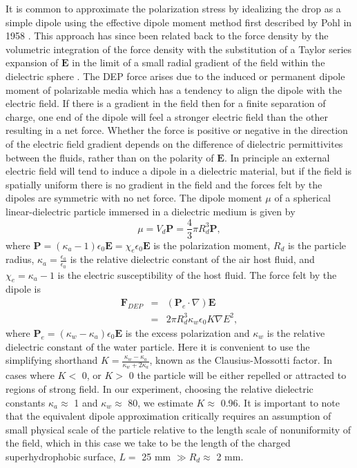 \documentclass[12pt,a4paper,oneside]{book}
\begin{document}
It is common to approximate the polarization stress by idealizing the drop as a simple dipole using the effective dipole moment method first described by Pohl in 1958 \cite{pohl_effects_1958}. This approach has since been related back to the force density by the volumetric integration of the force density with the substitution of a Taylor series expansion of $\mathbf{E}$ in the limit of a small radial gradient of the field within the dielectric sphere \cite{wang_general_1997}. The DEP force arises due to the induced or permanent dipole moment of polarizable media which has a tendency to align the dipole with the electric field. If there is a gradient in the field then for a finite separation of charge, one end of the dipole will feel a stronger electric field than the other resulting in a net force. Whether the force is positive or negative in the direction of the electric field gradient depends on the difference of dielectric permittivites between the fluids, rather than on the polarity of $\mathbf{E}$. In principle an external electric field will tend to induce a dipole in a dielectric material, but if the field is spatially uniform there is no gradient in the field and the forces felt by the dipoles are symmetric with no net force. The dipole moment $\mu$ of a spherical linear-dielectric particle immersed in a dielectric medium is given by
\begin{equation} \label{dipole_m_1}
\mu = V_d \mathbf{P} = \frac{4}{3} \pi R_d^3 \mathbf{P},
\end{equation} 
where $\mathbf{P} = \left(\kappa_a - 1 \right) \epsilon_0 \mathbf{E} = \chi_e \epsilon_0 \mathbf{E}$ is the polarization moment, $R_d$ is the particle radius, $\kappa_a = \frac{\epsilon_a}{\epsilon_0}$ is the relative dielectric constant of the air host fluid, and $\chi_e = \kappa_a - 1$ is the electric susceptibility of the host fluid. The force felt by the dipole is 
\begin{eqnarray} \label{dep_force}
\mathbf{F}_{DEP} &=& \left( \mathbf{P}_e \cdot \nabla \right) \mathbf{E} \nonumber \\
&=& 2 \pi R_d^3 \kappa_w \epsilon_0 K \nabla E^2,
\end{eqnarray}
where $\mathbf{P}_e=(\kappa_w - \kappa_a)\epsilon_0 \mathbf{E}$ is the excess polarization and $\kappa_w$ is the relative dielectric constant of the water particle. Here it is convenient to use the simplifying shorthand $K = \frac{\kappa_w - \kappa_a}{\kappa_w + 2 \kappa_a}$, known as the Clausius-Mossotti factor. In cases where $K <$ 0, or $K>$ 0 the particle will be either repelled or attracted to regions of strong field. In our experiment, choosing the relative dielectric constants $\kappa_a \approx$ 1 and $\kappa_w \approx$ 80, we estimate $K \approx$ 0.96. It is important to note that the equivalent dipole approximation critically requires an assumption of small physical scale of the particle relative to the length scale of nonuniformity of the field, which in this case we take to be the length of the charged superhydrophobic surface, $L =$ 25 mm $\gg R_d \approx$ 2 mm.
\end{document}
